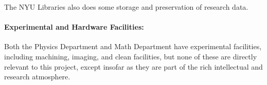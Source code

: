 The NYU Libraries also does some storage and preservation of research data.

\paragraph{Experimental and Hardware Facilities:}
Both the Physics Department and Math Department have experimental facilities, including machining, imaging, and clean facilities, but none of these are directly relevant to this project, except insofar as they are part of the rich intellectual and research atmosphere.
